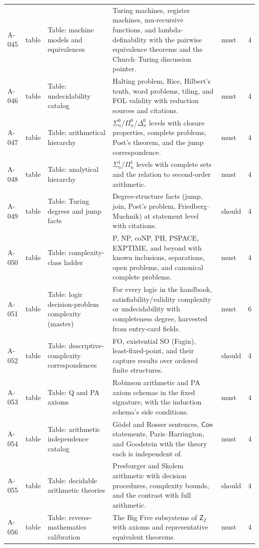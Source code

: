 \begin{longtable}{@{}p{0.45in}p{0.78in}p{2.02in}p{2.6in}p{0.42in}p{0.16in}@{}}
A-045 & table & Table: machine models and equivalences & Turing machines, register machines, mu-recursive functions, and lambda-definability with the pairwise equivalence theorems and the Church--Turing discussion pointer. & must & 4 \\
A-046 & table & Table: undecidability catalog & Halting problem, Rice, Hilbert's tenth, word problems, tiling, and FOL validity with reduction sources and citations. & must & 4 \\
A-047 & table & Table: arithmetical hierarchy & \(\Sigma^0_n\)/\(\Pi^0_n\)/\(\Delta^0_n\) levels with closure properties, complete problems, Post's theorem, and the jump correspondence. & must & 4 \\
A-048 & table & Table: analytical hierarchy & \(\Sigma^1_n\)/\(\Pi^1_n\) levels with complete sets and the relation to second-order arithmetic. & must & 4 \\
A-049 & table & Table: Turing degrees and jump facts & Degree-structure facts (jump, join, Post's problem, Friedberg--Muchnik) at statement level with citations. & should & 4 \\
A-050 & table & Table: complexity-class ladder & P, NP, coNP, PH, PSPACE, EXPTIME, and beyond with known inclusions, separations, open problems, and canonical complete problems. & must & 4 \\
A-051 & table & Table: logic decision-problem complexity (master) & For every logic in the handbook, satisfiability/validity complexity or undecidability with completeness degree, harvested from entry-card fields. & must & 6 \\
A-052 & table & Table: descriptive-complexity correspondences & FO, existential SO (Fagin), least-fixed-point, and their capture results over ordered finite structures. & should & 4 \\
A-053 & table & Table: Q and PA axioms & Robinson arithmetic and PA axiom schemas in the fixed signature, with the induction schema's side conditions. & must & 4 \\
A-054 & table & Table: arithmetic independence catalog & G\"odel and Rosser sentences, \(\mathsf{Con}\) statements, Paris--Harrington, and Goodstein with the theory each is independent of. & must & 4 \\
A-055 & table & Table: decidable arithmetic theories & Presburger and Skolem arithmetic with decision procedures, complexity bounds, and the contrast with full arithmetic. & should & 4 \\
A-056 & table & Table: reverse-mathematics calibration & The Big Five subsystems of \(\mathsf Z_2\) with axioms and representative equivalent theorems. & must & 4 \\

\end{longtable}
